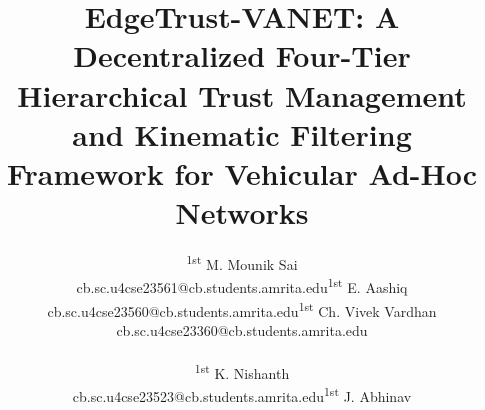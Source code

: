 \documentclass[conference]{IEEEtran}
\begin{document}

\title{
EdgeTrust-VANET: A Decentralized Four-Tier Hierarchical Trust Management and Kinematic Filtering Framework for Vehicular Ad-Hoc Networks
}

\author{
\begingroup
\renewcommand{\arraystretch}{0.90}
\setlength{\tabcolsep}{2pt}

\begin{tabular}{@{}ccc@{}}

\begin{minipage}[t]{0.30\textwidth}
\centering
\fontsize{8}{9}\selectfont
\textsuperscript{1st} M. Mounik Sai

\vspace{1pt}

cb.sc.u4cse23561@cb.students.amrita.edu
\end{minipage}
&
\begin{minipage}[t]{0.34\textwidth}
\centering
\fontsize{8}{9}\selectfont
\textsuperscript{1st} E. Aashiq

\vspace{1pt}

cb.sc.u4cse23560@cb.students.amrita.edu
\end{minipage}
&
\begin{minipage}[t]{0.30\textwidth}
\centering
\fontsize{8}{9}\selectfont
\textsuperscript{1st} Ch. Vivek Vardhan

\vspace{1pt}

cb.sc.u4cse23360@cb.students.amrita.edu
\end{minipage}

\\[-1mm]

\multicolumn{3}{c}{\rule{0pt}{4mm}}\\[-1mm]

\begin{minipage}[t]{0.30\textwidth}
\centering
\fontsize{8}{9}\selectfont
\textsuperscript{1st} K. Nishanth

\vspace{1pt}

cb.sc.u4cse23523@cb.students.amrita.edu
\end{minipage}
&
\begin{minipage}[t]{0.34\textwidth}
\centering
\fontsize{8}{9}\selectfont
\textsuperscript{1st} J. Abhinav


\end{minipage}
\end{tabular}}
\end{document}

